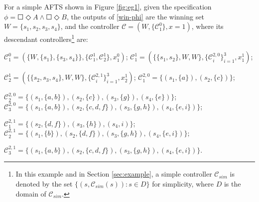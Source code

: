 \begin{example}
	\label{ex:exec}
	For a simple AFTS shown in Figure \ref{fig:eg1}, given the specification $ \phi = \Square \Diamond A \wedge \Square \Diamond B $, the outputs of \eqref{win-phi} are the winning set $ W= \{s_1,s_2,s_3,s_4\}$, and the controller $ \mathcal{C} = (W,\{\mathcal{C}^0_1\}, x = 1) $, where its {\color{teal}descendant} controllers\footnote{In this example and  in Section \ref{sec:example}, a simple controller $ \mathcal{C}_{sim} $ is denoted by the set $ \{(s,\mathcal{C}_{sim}(s)): s\in D\} $ for simplicity, where $ D $ is the domain of $ \mathcal{C}_{sim} $.}
	 are:
	
	\noindent$ \mathcal{C}^0_1 = (\{W,\{s_1\},\{s_3,s_4\}\},\{\mathcal{C}^1_1, \mathcal{C}^1_2\}, x^0_1 ) $; 
	$ \mathcal{C}^1_1 = (\{\{s_1,s_2\},W,W \},\{\mathcal{C}^{2,0}_i\}_{i=1}^3,x^1_1)$; 
	
	\noindent$ \mathcal{C}^1_2 = (\{\{s_2,s_3,s_4\},W,W \},\{\mathcal{C}^{2,1}_i\}_{i=1}^{3},x^1_2 )$; $ \mathcal{C}^{2,0}_1 = \{(s_1,\{a\}),(s_2,\{c\})\} $; 
	
	\noindent$ \mathcal{C}^{2,0}_2 = \{(s_1,\{a,b\}),(s_2,\{c\}),(s_3,\{g\}),(s_4,\{e\})\} $;
	$ \mathcal{C}^{2,0}_3 = \{(s_1,\{a,b\}),(s_2,\{c,d,f\}),(s_3,\{g,h\}),(s_4,\{e,i\})\} $; 
	
	\noindent$ \mathcal{C}^{2,1}_1 = \{(s_2,\{d,f\}),(s_3,\{h\}),(s_4,i)\} $; $ \mathcal{C}^{2,1}_2 = \{(s_1,\{b\}),(s_2,\{d,f\}), (s_3,\{g,h\}), (s_4,\{e,i\})\} $;
	
	\noindent$ \mathcal{C}^{2,1}_3 = \{(s_1,\{a,b\}),(s_2,\{c,d,f\}),(s_3,\{g,h\}),(s_4,\{e,i\})\} $.
	

\end{example}
